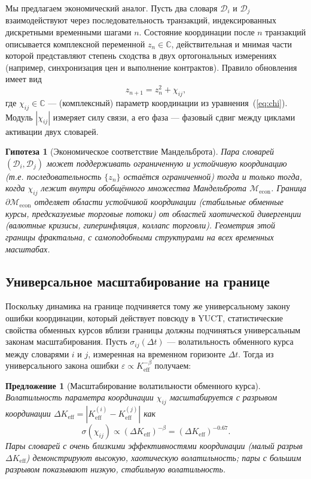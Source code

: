 \documentclass[12pt,a4paper]{article}
\newtheorem{proposition}[theorem]{Предложение}
\newtheorem{conjecture}[theorem]{Гипотеза}
\theoremstyle{remark}
\begin{document}
	Мы предлагаем экономический аналог. Пусть два словаря \(\mathcal{D}_i\) и \(\mathcal{D}_j\) взаимодействуют через последовательность транзакций, индексированных дискретными временными шагами \(n\). Состояние координации после \(n\) транзакций описывается комплексной переменной \(z_n \in \mathbb{C}\), действительная и мнимая части которой представляют степень сходства в двух ортогональных измерениях (например, синхронизация цен и выполнение контрактов). Правило обновления имеет вид
	\begin{equation}
		z_{n+1} = z_n^2 + \chi_{ij},
		\label{eq:mandel_econ}
	\end{equation}
	где \(\chi_{ij} \in \mathbb{C}\) — (комплексный) параметр координации из уравнения~(\ref{eq:chi}). Модуль \(|\chi_{ij}|\) измеряет силу связи, а его фаза — фазовый сдвиг между циклами активации двух словарей.
	
	\begin{conjecture}[Экономическое соответствие Мандельброта]
		Пара словарей \((\mathcal{D}_i, \mathcal{D}_j)\) может поддерживать ограниченную и устойчивую координацию (т.е. последовательность \(\{z_n\}\) остаётся ограниченной) тогда и только тогда, когда \(\chi_{ij}\) лежит внутри обобщённого множества Мандельброта \(\mathcal{M}_{\mathrm{econ}}\). Граница \(\partial\mathcal{M}_{\mathrm{econ}}\) отделяет области устойчивой координации (стабильные обменные курсы, предсказуемые торговые потоки) от областей хаотической дивергенции (валютные кризисы, гиперинфляция, коллапс торговли). Геометрия этой границы фрактальна, с самоподобными структурами на всех временных масштабах.
	\end{conjecture}
	
	\subsection{Универсальное масштабирование на границе}
	
	Поскольку динамика на границе подчиняется тому же универсальному закону ошибки координации, который действует повсюду в YUCT, статистические свойства обменных курсов вблизи границы должны подчиняться универсальным законам масштабирования. Пусть \(\sigma_{ij}(\Delta t)\) — волатильность обменного курса между словарями \(i\) и \(j\), измеренная на временном горизонте \(\Delta t\). Тогда из универсального закона ошибки \(\varepsilon \propto K_{\mathrm{eff}}^{-\beta}\) получаем:
	
	\begin{proposition}[Масштабирование волатильности обменного курса]
		Волатильность параметра координации \(\chi_{ij}\) масштабируется с разрывом координации \(\Delta K_{\mathrm{eff}} = |K_{\mathrm{eff}}^{(i)} - K_{\mathrm{eff}}^{(j)}|\) как
		\begin{equation}
			\sigma(\chi_{ij}) \propto (\Delta K_{\mathrm{eff}})^{-\beta} = (\Delta K_{\mathrm{eff}})^{-0.67}.
			\label{eq:vol_scaling}
		\end{equation}
		Пары словарей с очень близкими эффективностями координации (малый разрыв \(\Delta K_{\mathrm{eff}}\)) демонстрируют высокую, хаотическую волатильность; пары с большим разрывом показывают низкую, стабильную волатильность.
	\end{proposition}
	
\end{document}
